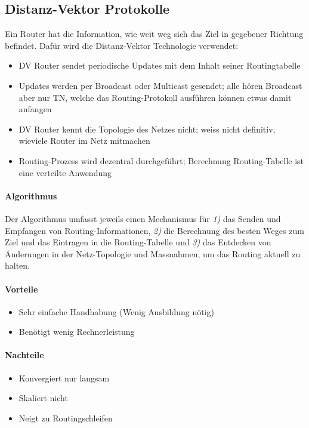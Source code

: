 \documentclass[a4paper,12pt]{article}
\begin{document}
\subsection{Distanz-Vektor Protokolle}
Ein Router hat die Information, wie weit weg sich das Ziel in gegebener Richtung befindet. Dafür wird die Distanz-Vektor Technologie verwendet:
\begin{itemize}
\item DV Router sendet periodische Updates mit dem Inhalt seiner Routingtabelle
\item Updates werden per Broadcast oder Multicast gesendet; alle hören Broadcast aber nur TN, welche das Routing-Protokoll ausführen können etwas damit anfangen
\item DV Router kennt die Topologie des Netzes nicht; weiss nicht definitiv, wieviele Router im Netz mitmachen
\item Routing-Prozess wird dezentral durchgeführt; Berechnung Routing-Tabelle ist eine verteilte Anwendung
\end{itemize}

\paragraph{Algorithmus}
Der Algorithmus umfasst jeweils einen Mechanismus für \emph{1)} das Senden und Empfangen von Routing-Informationen, \emph{2)} die Berechnung des besten Weges zum Ziel und das Eintragen in die Routing-Tabelle und \emph{3)} das Entdecken von Änderungen in der Netz-Topologie und Massnahmen, um das Routing aktuell zu halten.

\paragraph{Vorteile}
\begin{itemize}
\item Sehr einfache Handhabung (Wenig Ausbildung nötig)
\item Benötigt wenig Rechnerleistung
\end{itemize}

\paragraph{Nachteile}
\begin{itemize}
\item Konvergiert nur langsam
\item Skaliert nicht
\item Neigt zu Routingschleifen
\end{itemize}
\end{document}
